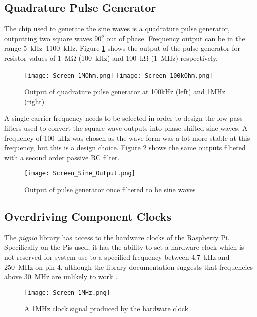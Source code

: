 \documentclass[../main.tex]{subfiles}
\begin{document}
\subsection{Quadrature Pulse Generator}

The chip used to generate the sine waves is a quadrature pulse generator, outputting two square waves $90^o$ out of phase.
Frequency output can be in the range \SIrange{5}{1100}{\kilo\hertz}.
Figure \ref{fig_Pulse Output} shows the output of the pulse generator for resistor values of \SI{1}{\mega\ohm} (\SI{100}{\kilo\hertz}) and \SI{100}{\kilo\ohm} (\SI{1}{\mega\hertz}) respectively.

\begin{figure}[ht]
	\centering
	\texttt{[image: Screen\_1MOhm.png]}
	\texttt{[image: Screen\_100kOhm.png]}
	\caption{Output of quadrature pulse generator at 100kHz (left) and 1MHz (right)}
	\label{fig_Pulse Output}
\end{figure}

A single carrier frequency needs to be selected in order to design the low pass filters used to convert the square wave outputs into phase-shifted sine waves.
A frequency of \SI{100}{\kilo\hertz} was chosen as the wave form was a lot more stable at this frequency, but this is a design choice.
Figure \ref{fig_ADC Sine} shows the same outputs filtered with a second order passive RC filter.

\begin{figure}[ht]
	\centering
	\texttt{[image: Screen\_Sine\_Output.png]}
	\caption{Output of pulse generator once filtered to be sine waves}
	\label{fig_ADC Sine}
\end{figure}

\subsection{Overdriving Component Clocks} \label{sec_Overclocking}

The \textit{pigpio} library has access to the hardware clocks of the Raspberry Pi.
Specifically on the Pis used, it has the ability to set a hardware clock which is not reserved for system use to a specified frequency between \SI{4.7}{\kilo\hertz} and \SI{250}{\mega\hertz} on pin 4, although the library documentation suggests that frequencies above \SI{30}{\mega\hertz} are unlikely to work \cite{lib_pigpioHWClock}.\\

\begin{figure}[ht]
	\centering
	\texttt{[image: Screen\_1MHz.png]}
	\caption{A 1MHz clock signal produced by the hardware clock}
	\label{fig_HWClock}
\end{figure}
\end{document}
